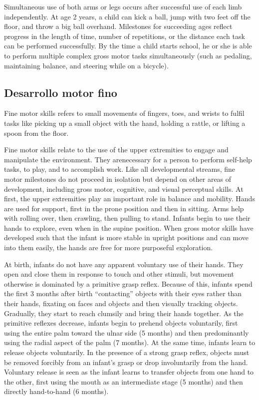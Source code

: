 Simultaneous use of both arms or legs occurs after successful use of each limb
independently. At age 2 years, a child can kick a ball, jump with two feet off
the floor, and throw a big ball overhand. Milestones for succeeding ages
reflect progress in the length of time, number of repetitions, or the distance
each task can be performed successfully. By the time a child starts school, he
or she is able to perform multiple complex gross motor tasks simultaneously
(such as pedaling, maintaining balance, and steering while on a bicycle).
\cite{Gerber2010}

\subsection {Desarrollo motor fino}
Fine motor skills refers to small movements of fingers, toes, and wrists to
fulfil tasks like picking up a small object with the hand, holding a rattle, or
lifting a spoon from the floor. \cite{Panda2021}

Fine motor skills relate to the use of the upper extremities to engage and 
manipulate the environment. They arenecessary for a person to perform self-help 
tasks, to play, and to accomplish work. Like all developmental streams, fine
motor milestones do not proceed in isolation but depend on other areas of
development, including gross motor, cognitive, and visual perceptual skills. At
first, the upper extremities play an important role in balance and mobility.
Hands are used for support, first in the prone position and then in sitting.
Arms help with rolling over, then crawling, then pulling to stand. Infants
begin to use their hands to explore, even when in the supine position.
When gross motor skills have developed such that the
infant is more stable in upright positions and can move
into them easily, the hands are free for more purposeful
exploration. \cite{Gerber2010}

At birth, infants do not have any apparent voluntary use of their hands. They
open and close them in response to touch and other stimuli, but movement
otherwise is dominated by a primitive grasp reflex. Because of this, infants
spend the first 3 months after birth “contacting” objects with their eyes
rather than their hands, fixating on faces and objects and then visually
tracking objects. Gradually, they start to reach clumsily and bring their hands
together. As the primitive reflexes decrease, infants begin to prehend objects
voluntarily, first using the entire palm toward the ulnar side (5 months) and
then predominantly using the radial aspect of the palm (7 months). At the same
time, infants learn to release objects voluntarily. In the presence of a strong
grasp reflex, objects must be removed forcibly from an infant’s grasp or drop
involuntarily from the hand. Voluntary release is seen as the infant learns to
transfer objects from one hand to the other, first using the mouth as an
intermediate stage (5 months) and then directly hand-to-hand (6 months).
\cite{Gerber2010}


